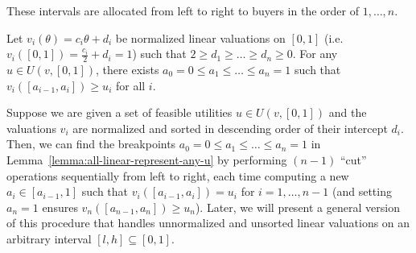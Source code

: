 These intervals are allocated from left to right to buyers in the order of $1, \dots, n$.
\begin{lemma}
	Let $v_i(\theta) = c_i \theta+d_i$ be normalized linear valuations on $[0,1]$ (i.e. $ v_i([0,1]) = \frac{c_i}{2}+d_i = 1$) such that $2\geq d_1 \geq \dots \geq d_n \geq 0$. For any $u\in  U(v, [0,1])$, there exists $a_0 = 0 \leq a_1 \leq \dots \leq a_n = 1$ such that $v_i([a_{i-1}, a_i]) \geq u_i$ for all $i$. \label{lemma:all-linear-represent-any-u}
\end{lemma}
Suppose we are given a set of feasible utilities $u \in U(v, [0,1])$ and the valuations $v_i$ are normalized and sorted in descending order of their intercept $d_i$. 
Then, we can find the breakpoints $a_0 = 0\leq a_1 \leq \dots \leq a_n=1$ in Lemma~\ref{lemma:all-linear-represent-any-u} by performing $(n-1)$ ``cut'' operations sequentially from left to right, each time computing a new $a_i\in [a_{i-1}, 1]$ such that $v_i([a_{i-1}, a_i]) = u_i$ for $i=1, \dots, n-1$ (and setting $a_n = 1$ ensures $v_n([a_{n-1}, a_n]) \geq u_n$). Later, we will present a general version of this procedure that handles unnormalized and unsorted linear valuations on an arbitrary interval $[l,h]\subseteq [0,1]$.

